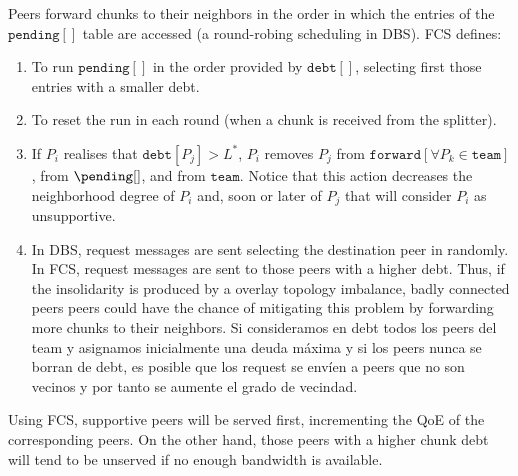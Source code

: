 Peers forward chunks to their neighbors in the order in which the
entries of the $\mathtt{pending}[]$ table are accessed (a round-robing
scheduling in DBS). FCS defines:
\begin{enumerate}
\item To run $\mathtt{pending}[]$ in the order provided by
  $\mathtt{debt}[]$, selecting first those entries with a smaller
  debt.
\item To reset the run in each round (when a chunk is received from the
  splitter).
\item If $P_i$ realises that $\mathtt{debt}[P_j]>L^*$, $P_i$ removes
  $P_j$ from $\mathtt{forward}[\forall P_k\in\mathtt{team}]$, from
  $\pending[]$, and from $\mathtt{team}$. Notice that this action
  decreases the neighborhood degree of $P_i$ and, soon or later of
  $P_j$ that will consider $P_i$ as unsupportive.
\item In DBS, request messages are sent selecting the destination peer
  in randomly. In FCS, request messages are sent to those peers with a
  higher debt. Thus, if the insolidarity is produced by a overlay
  topology imbalance, badly connected peers peers could have the
  chance of mitigating this problem by forwarding more chunks to their
  neighbors. Si consideramos en debt todos los peers del team y asignamos inicialmente una deuda máxima y si los peers nunca se borran de debt, es posible que los request se envíen a peers que no son vecinos y por tanto se aumente el grado de vecindad.
\end{enumerate}

Using FCS, supportive peers will be served first, incrementing the
QoE of the corresponding peers. On the other hand, those peers with a
higher chunk debt will tend to be unserved if no enough bandwidth is
available. 


